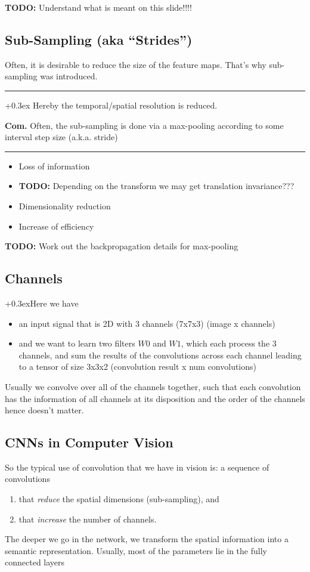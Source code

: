 \documentclass[a2paper,4pt]{extarticle}
\newcommand\pro{\item[$+$]}
\newcommand\con{\item[$-$]}
\newcommand{\todo}[1]{\textbf{TODO:} #1}
\newcommand{\todo}[1]{%
}
\newcommand{\customboxpaddingsize}{0pt}
\newcommand{\emptyarg}[1][]{\ifthenelse{\isempty{#1}}{}{\ (#1)}}
\newcommand{\Def}[1][]{{\setlength\fboxsep{\customboxpaddingsize}
\colorbox{defcolor}{%
\color{custtitlecolor}{\textbf{D.\emptyarg[#1]}}}\kern+0.3ex}}
\newcommand{\Ex}[1][]{{\setlength\fboxsep{\customboxpaddingsize}
\colorbox{excolor}{%
\color{custtitlecolor}{\textbf{Ex.\emptyarg[#1]}}}\kern+0.3ex}}
\newcommand{\Com}{\textbf{Com.} }
\newcommand{\sep}{\vspace{0pt}\noindent\hrule\vspace{0pt}}
\newcommand{\sep}{\vspace{5pt}\noindent\hrule\vspace{5pt}}
\begin{document}
\begin{landscape}
\begin{multicols*}{7}
\todo{Understand what is meant on this slide!!!!}

\subsection{Sub-Sampling (aka ``Strides'')}

Often, it is desirable to reduce the size of the feature maps. That's why
sub-sampling was introduced.

\sep

\Def[Sub-Sampling] Hereby the temporal/spatial resolution is reduced.

\Com Often, the sub-sampling is done via a max-pooling according to some
interval step size (a.k.a. stride)

\sep

\begin{itemize}
  \con Loss of information
  \pro \todo{Depending on the transform we may get translation invariance???}
  \pro Dimensionality reduction
  \pro Increase of efficiency
\end{itemize}

\todo{Work out the backpropagation details for max-pooling}

\subsection{Channels}

\Ex Here we have
\begin{itemize}
  \item an input signal that is 2D with 3 channels (7x7x3) (image x channels)
  \item and we want to learn two filters $W0$ and $W1$, which each process the 3
  channels, and sum the results of the convolutions across each channel leading
  to a tensor of size 3x3x2 (convolution result x num convolutions)
\end{itemize}


Usually we convolve over all of the channels together, such that each
convolution has the information of all channels at its disposition and the
order of the channels hence doesn't matter.

\subsection{CNNs in Computer Vision}

So the typical use of convolution that we have in vision is: a sequence of
convolutions
\begin{enumerate}
  \item that \emph{reduce} the spatial dimensions (sub-sampling), and
  \item that \emph{increase} the number of channels.
\end{enumerate}
The deeper we go in the network, we transform the spatial information into a
semantic representation. Usually, most of the parameters lie in the fully
connected layers


\end{multicols*}
\end{landscape}
\end{document}
